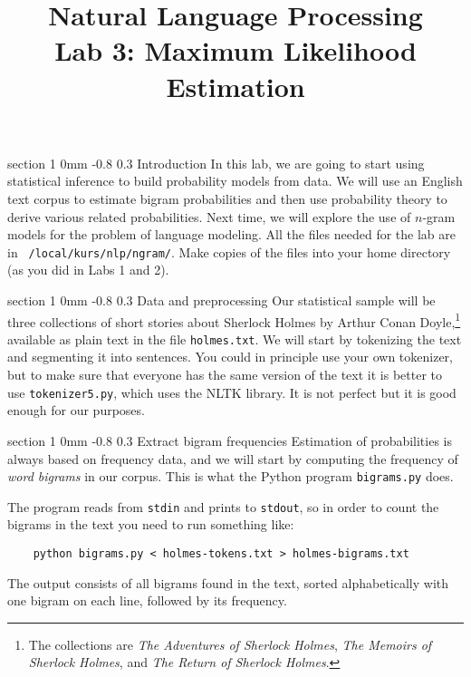 \documentclass[11pt]{article}
\title{{\LARGE Natural Language Processing}\\[1.5mm]{\large Lab 3: Maximum Likelihood Estimation}}
\author{}
\date{} %
\makeatletter
\newcommand{\newsec}[2]{\section{#1}\label{sec:#2}\noindent}
\renewcommand{\section}{\@startsection
{section}%
{1}%
{0mm}%
{-0.8\baselineskip}%
{0.3\baselineskip}%
{\bfseries\large}}%
\makeatother
\begin{document}
 

\maketitle
\vspace{-2mm} \newsec{Introduction}{intro}%
In this lab, we are going to start using statistical inference
to build probability models from data.  We will use an English text
corpus to estimate bigram probabilities and then use probability
theory to derive various related probabilities. Next time, we will
explore the use of $n$-gram models for the problem of language
modeling. All the files needed for the lab are in {\tt
  /local/kurs/nlp/ngram/}. Make copies of the files into your home
directory (as you did in Labs 1 and 2).

\newsec{Data and preprocessing}{data}%
Our statistical sample will be three collections of short stories
about Sherlock Holmes by Arthur Conan Doyle,\footnote{The collections
  are {\em The Adventures of Sherlock Holmes}, {\em The Memoirs of
    Sherlock Holmes}, and {\em The Return of Sherlock Holmes}.}
available as plain text in the file {\tt holmes.txt}. We will start by
tokenizing the text and segmenting it into sentences.  You could in
principle use your own tokenizer, but to make sure that everyone has
the same version of the text it is better to use {\tt tokenizer5.py},
which uses the NLTK library. It is not perfect but it is good enough 
for our purposes.


\newsec{Extract bigram frequencies }{bigrams}%
Estimation of probabilities is always based on frequency data, and we
will start by computing the frequency of \emph{word bigrams} in our
corpus. This is what the Python program {\tt bigrams.py} does.

\begin{center}
\fbox{

}
\end{center}
\newpage
\noindent
The program reads from {\tt stdin} and prints to {\tt stdout}, so in
order to count the bigrams in the text you need to run something like:
\begin{verbatim}
    python bigrams.py < holmes-tokens.txt > holmes-bigrams.txt
\end{verbatim}
The output consists of all bigrams found in the text, sorted
alphabetically with one bigram on each line, followed by its
frequency.
\end{document}
